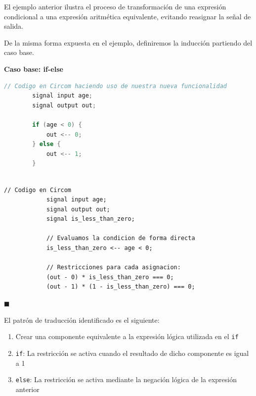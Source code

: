 \documentclass[a4paper,12pt]{report}
\begin{document}
	
	\vspace{0.3cm}
	\noindent El ejemplo anterior ilustra el proceso de transformación de una expresión condicional a una expresión aritmética equivalente, evitando reasignar la señal de salida.
	
	\vspace{0.3cm}
	\noindent De la misma forma expuesta en el ejemplo, definiremos la inducción partiendo del caso base.
	
	\vspace{0.3cm}
	\noindent \textbf{Caso base: if-else}
	\vspace{0.3cm}
	\begin{lstlisting}[language=C]
		// Codigo en Circom haciendo uso de nuestra nueva funcionalidad
		signal input age;
		signal output out;
		
		if (age < 0) {
			out <-- 0;
		} else {
			out <-- 1;
		}
		
	\end{lstlisting} 
	
	\begin{mi_ejemplo}
		
		
		\begin{lstlisting}[language=Circom]
			// Codigo en Circom
			signal input age;
			signal output out;
			signal is_less_than_zero;
			
			// Evaluamos la condicion de forma directa
			is_less_than_zero <-- age < 0;
			
			// Restricciones para cada asignacion:
			(out - 0) * is_less_than_zero === 0;
			(out - 1) * (1 - is_less_than_zero) === 0;
		\end{lstlisting}
		
		\hspace*{\fill} $\blacksquare$
		\caption{Caso base condicional}
		\label{ex:caso-base-cond}
	\end{mi_ejemplo}
	
	\vspace{0.2cm}
	\noindent El patrón de traducción identificado es el siguiente:
	\begin{enumerate}
		\item Crear una componente equivalente a la expresión lógica utilizada en el \texttt{if}
		\item \texttt{if}: La restricción se activa cuando el resultado de dicho componente es igual a 1
		\item \texttt{else}: La restricción se activa mediante la negación lógica de la expresión anterior
	\end{enumerate}
	
\end{document}
